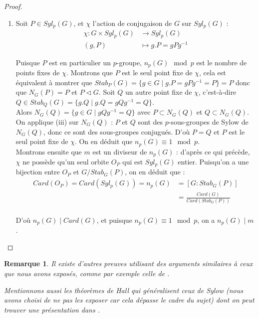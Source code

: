 \documentclass{article}
\theoremstyle{definition}
\theoremstyle{plain}
\theoremstyle{plain}
\theoremstyle{plain}
\theoremstyle{plain}
\newtheorem{remark}[subsubsection]{Remarque}
\theoremstyle{definition}
\theoremstyle{plain}
\theoremstyle{plain}
\begin{document}
\begin{proof}
\begin{enumerate}[label={\upshape(\roman*)}]
\item Soit \( P \in Syl_{p}(G) \), et \( \chi \) l'action de conjugaison de \( G \) sur \( Syl_{p}(G) \) :
\begin{align*}
	\chi : G \times Syl_{p}(G) &\to Syl_{p}(G) \\
	(g,P) &\mapsto g.P = gPg^{-1}
\end{align*}

Puisque \( P \) est en particulier un \(p\)-groupe, \( n_p(G) \mod p \) est le nombre de points fixes de \( \chi \). Montrons que \( P \) est le seul point fixe de \( \chi \), cela est équivalent à montrer que \( Stab_P(G) = \{ g \in G \mid g.P = gPg^{-1} = P \} = P \) donc que \( N_G(P) = P \) et \( P \triangleleft G \). Soit \( Q \) un autre point fixe de \( \chi \), c'est-à-dire \(Q \in Stab_Q(G) = \{g.Q \mid g.Q = gQg^{-1} = Q \}  \). \\
Alors \( N_G(Q) = \{ g \in G \mid gQg^{-1} = Q\} \) avec \( P \subset N_G(Q) \) et \( Q \subset N_G(Q) \). \\
On applique (iii) sur \( N_G(Q) \) : \( P \) et \( Q \) sont des \(p\)-sous-groupes de Sylow de \( N_G(Q) \), donc ce sont des sous-groupes conjugués. D'où \( P = Q \) et \( P \) est le seul point fixe de \( \chi \). On en déduit que \( n_p(G) \equiv 1 \mod p \). \\
Montrons ensuite que \( m \) est un diviseur de \( n_p(G) \) : d'après ce qui précède, \( \chi \) ne possède qu'un seul orbite \( O_P \) qui est \( Syl_p({G}) \) entier. Puisqu'on a une bijection entre \( O_P \) et \( G/Stab_G(P) \), on en déduit que :
\begin{align*}
	Card(O_P)= Card(Syl_p(G)) = n_p(G) &= [G : Stab_G(P) ] \\ 
		 &= \frac{Card(G)}{Card(Stab_G(P))}\\
\end{align*}

D'où \( n_p(G) \mid Card(G) \), et puisque \( n_p(G) \equiv 1\mod p \), on a \( n_p(G) \mid m \).
	\end{enumerate}
\end{proof}

\begin{remark}
	Il existe d'autres preuves utilisant des arguments similaires à ceux que nous avons exposés, comme par exemple celle de \cite[p.~ 140-141]{dummit2003abstract}. 

	Mentionnons aussi les théorèmes de Hall qui généralisent ceux de Sylow (nous avons choisi de ne pas les exposer car cela dépasse le cadre du sujet) dont on peut trouver une présentation dans \cite[p.~ 40-44]{serre1979ens}.
\end{remark}
\end{document}

